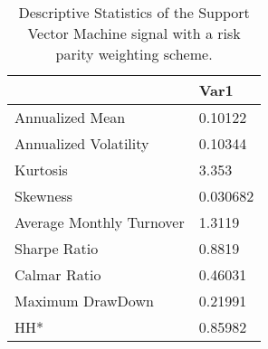 \begin{table}[H]
\centering
\begin{tabular}{ll}
& Var1 \\ 
\hline 
Annualized Mean & 0.10122 \\ 
Annualized Volatility & 0.10344 \\ 
Kurtosis & 3.353 \\ 
Skewness & 0.030682 \\ 
Average Monthly Turnover & 1.3119 \\ 
Sharpe Ratio & 0.8819 \\ 
Calmar Ratio & 0.46031 \\ 
Maximum DrawDown & 0.21991 \\ 
HH* & 0.85982 \\ 
\hline
\end{tabular}
\caption{Descriptive Statistics of the Support Vector Machine signal with a risk parity weighting scheme.}
\label{SVM_MODEL_Risk}
\end{table}